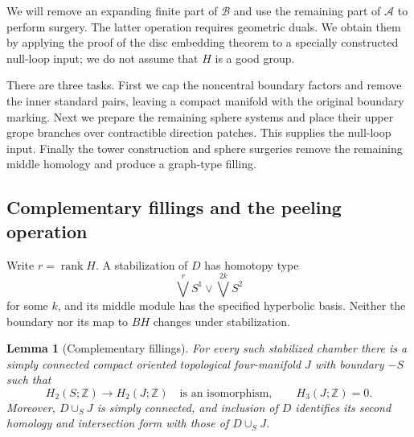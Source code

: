 \documentclass[11pt]{article}
\newtheorem{lemma}[theorem]{Lemma}
\theoremstyle{definition}
\theoremstyle{remark}
\newcommand{\Z}{\mathbb Z}
\begin{document}
We will remove an expanding finite part of $\mathcal B$ and use the
remaining part of $\mathcal A$ to perform surgery.  The latter operation
requires geometric duals.  We obtain them by applying the proof of the
disc embedding theorem to a specially constructed null-loop input;
we do not assume that $H$ is a good group.

There are three tasks. First we cap the noncentral boundary factors and
remove the inner standard pairs, leaving a compact manifold with the
original boundary marking. Next we prepare the remaining sphere
systems and place their upper grope branches over contractible
direction patches. This supplies the null-loop input. Finally the
tower construction and sphere surgeries remove the remaining middle
homology and produce a graph-type filling.

\subsection{Complementary fillings and the peeling operation}

Write $r=\operatorname{rank}H$.  A stabilization of $D$ has homotopy type
\[
        \bigvee^r S^1\vee\bigvee^{2k}S^2
\]
for some $k$, and its middle module has the specified hyperbolic basis.
Neither the boundary nor its map to $BH$ changes under stabilization.

\begin{lemma}[Complementary fillings]\label{ct:fillings}
For every such stabilized chamber there is a simply connected compact
oriented topological four-manifold $J$ with boundary $-S$ such that
\[
 H_2(S;\Z)\longrightarrow H_2(J;\Z)
 \quad\text{is an isomorphism},\qquad H_3(J;\Z)=0.
\]
Moreover, $D\cup_S J$ is simply connected, and inclusion of $D$ identifies
its second homology and intersection form with those of $D\cup_S J$.
\end{lemma}
\end{document}

